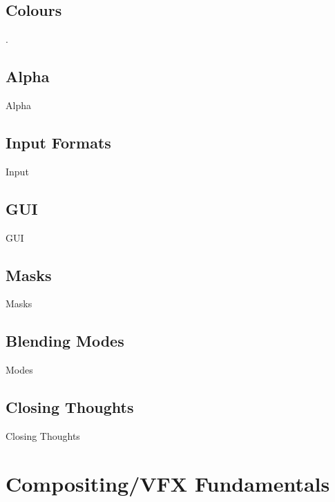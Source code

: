 \documentclass[10pt,oneside,openany,letterpaper]{memoir}
\begin{document}
\chapter{Colours}
.








\chapter{Alpha}
Alpha








\chapter{Input Formats}
Input








\chapter{GUI}
GUI







\chapter{Masks}
Masks







\chapter{Blending Modes}
Modes







\chapter{Closing Thoughts}
Closing Thoughts


\part{Compositing/VFX Fundamentals}
\end{document}
